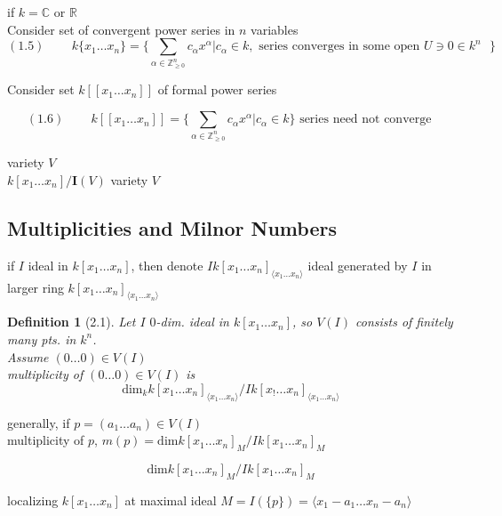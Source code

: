 \documentclass[10pt]{amsart}
\newtheorem{definition}{Definition}
\begin{document}
\begin{multicols*}{2}
if $k = \mathbb{C}$ or $\mathbb{R}$ \\

Consider set of convergent power series in $n$ variables \\

\begin{equation}
(1.5) \quad \quad \,   k\lbrace x_1 \dots x_n \rbrace = \lbrace \sum_{\alpha \in \mathbb{Z}^n_{\geq 0}} c_{\alpha} x^{\alpha} | c_{\alpha} \in k, \text{ series converges in some open $U\ni 0 \in k^n $ } \rbrace
\end{equation}

Consider set $k[[x_1 \dots x_n]]$ of formal power series

\begin{equation}
  (1.6) \quad \quad \, k[[x_1 \dots x_n]] = \lbrace \sum_{\alpha \in \mathbb{Z}^n_{\geq 0}} c_{\alpha} x^{\alpha} | c_{\alpha} \in k \rbrace \text{ series need not converge }
\end{equation} 


variety $V$ \\

$k[x_1\dots x_n]/\mathbf{I}(V)$ \phantom{ \quad \quad \quad } variety $V$


\subsection{Multiplicities and Milnor Numbers}


if $I$ ideal in $k[x_1\dots x_n]$, then denote $Ik[x_1\dots x_n]_{\langle x_1 \dots x_n \rangle}$ ideal generated by $I$ in larger ring $k[x_1\dots x_n]_{\langle x_1 \dots x_n \rangle}$

\begin{definition}[2.1] Let $I$ $0$-dim. ideal in $k[x_1 \dots x_n]$, so $V(I)$ consists of finitely many pts. in $k^n$.  \\
Assume $(0 \dots 0) \in V(I)$ \\
multiplicity of $(0\dots 0)\in V(I)$ is 
\[
\text{dim}_k{ k[x_1\dots x_n]_{\langle x_1\dots x_n \rangle}} / Ik[x_!\dots x_n]_{\langle x_1 \dots x_n \rangle}
\]
\end{definition}


generally, if $p=(a_1 \dots a_n) \in V(I)$ \\
multiplicity of $p$, $m(p) = \text{dim}{ k[x_1 \dots x_n]_M } / Ik[x_1 \dots x_n]_M$

\[
\text{dim}{ k[x_1 \dots x_n]_M } / Ik[x_1 \dots x_n]_M
\]

localizing $k[x_1 \dots x_n]$ at maximal ideal $M = I(\lbrace p \rbrace) = \langle x_1 - a_1 \dots x_n-a_n \rangle$



\end{multicols*}
\end{document}
